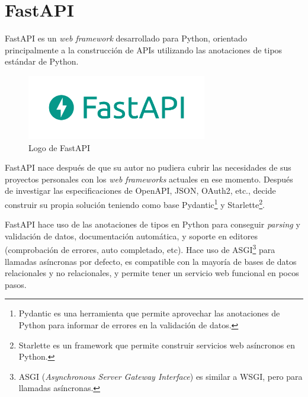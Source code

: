 
\section{FastAPI}\label{sec:fastapi}

FastAPI es un \emph{web framework} desarrollado para Python, orientado principalmente a la construcción de APIs utilizando las anotaciones de tipos estándar de Python. \emph{\parencite{Reference14}}

\begin{figure}[ht]
    \centering
    \includegraphics[width=0.7\textwidth]{Figures/fastapi-logo}
    \decoRule
    \caption[FastAPI (Logo)]{Logo de FastAPI \emph{\parencite{Reference14}}}
    \label{fig:fastapi-logo}
\end{figure}

FastAPI nace después de que su autor no pudiera cubrir las necesidades de sus proyectos personales con los \emph{web frameworks} actuales en ese momento. Después de investigar las especificaciones de OpenAPI, JSON, OAuth2, etc., decide construir su propia solución teniendo como base Pydantic\footnote{Pydantic es una herramienta que permite aprovechar las anotaciones de Python para informar de errores en la validación de datos.} y Starlette\footnote{Starlette es un framework que permite construir servicios web asíncronos en Python.}. \emph{\parencite{Reference15}}

FastAPI hace uso de las anotaciones de tipos en Python para conseguir \emph{parsing} y validación de datos, documentación automática, y soporte en editores (comprobación de errores, auto completado, etc). Hace uso de ASGI\footnote{ASGI (\emph{Asynchronous Server Gateway Interface}) es similar a WSGI, pero para llamadas asíncronas.} para llamadas asíncronas por defecto, es compatible con la mayoría de bases de datos relacionales y no relacionales, y permite tener un servicio web funcional en pocos pasos. \emph{\parencite{Reference14}}

